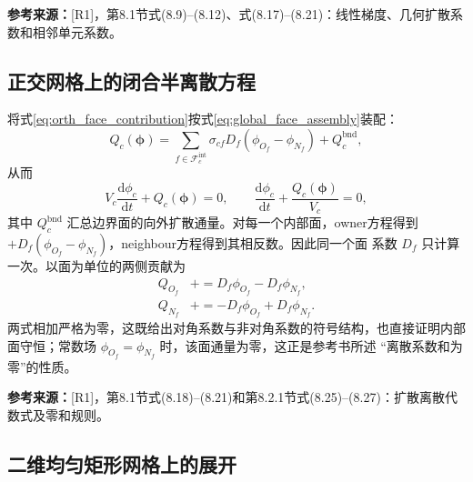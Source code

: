 \documentclass[UTF8,12pt,a4paper]{ctexart}
\numberwithin{equation}{section}
\newcommand{\Rone}{\textnormal{[R1]}}
\newcommand{\source}[1]{%
  \par\smallskip
  \noindent\colorbox{sourcebg}{%
    \parbox{0.955\linewidth}{\raggedright\footnotesize\color{sourcegray}\textbf{参考来源：}#1}%
  }
  \par\smallskip
}
\begin{document}
\source{\Rone，第8.1节式(8.9)--(8.12)、式(8.17)--(8.21)：线性梯度、几何扩散系数和相邻单元系数。}

\subsection{正交网格上的闭合半离散方程}

将式\eqref{eq:orth_face_contribution}按式\eqref{eq:global_face_assembly}装配：
\begin{equation}
  \boxed{
  Q_c(\bm\phi)
  =\sum_{f\in\mathcal F_c^{\mathrm{int}}}
  \sigma_{cf}D_f(\phi_{O_f}-\phi_{N_f})+Q_c^{\mathrm{bnd}},}
  \label{eq:orth_Q}
\end{equation}
从而
\begin{equation}
  \boxed{
  V_c\frac{\mathrm d\phi_c}{\mathrm dt}+Q_c(\bm\phi)=0,
  \qquad
  \frac{\mathrm d\phi_c}{\mathrm dt}+\frac{Q_c(\bm\phi)}{V_c}=0,}
  \label{eq:orth_semidiscrete}
\end{equation}
其中 $Q_c^{\mathrm{bnd}}$ 汇总边界面的向外扩散通量。对每一个内部面，owner方程得到
$+D_f(\phi_{O_f}-\phi_{N_f})$，neighbour方程得到其相反数。因此同一个面
系数 $D_f$ 只计算一次。以面为单位的两侧贡献为
\begin{equation}
  \begin{aligned}
  Q_{O_f}&\mathrel{+}=D_f\phi_{O_f}-D_f\phi_{N_f},\\
  Q_{N_f}&\mathrel{+}=-D_f\phi_{O_f}+D_f\phi_{N_f}.
  \end{aligned}
  \label{eq:orth_expanded}
\end{equation}
两式相加严格为零，这既给出对角系数与非对角系数的符号结构，也直接证明内部
面守恒；常数场 $\phi_{O_f}=\phi_{N_f}$ 时，该面通量为零，这正是参考书所述
“离散系数和为零”的性质。

\source{\Rone，第8.1节式(8.18)--(8.21)和第8.2.1节式(8.25)--(8.27)：扩散离散代数式及零和规则。}

\subsection{二维均匀矩形网格上的展开}
\end{document}
